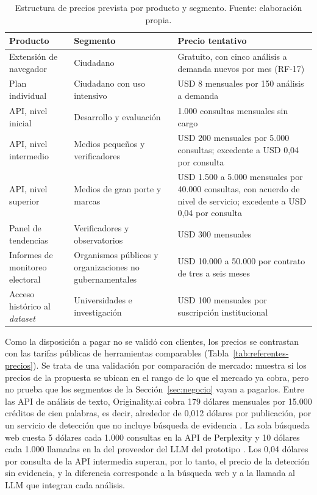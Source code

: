 \begin{table}[t]
  \centering
  \small
  \caption{Estructura de precios prevista por producto y segmento. Fuente: elaboración propia.}
  \label{tab:pricing}
  \begin{tabular}{p{4.4cm} p{4.2cm} p{4.6cm}}
    \hline
    \textbf{Producto} & \textbf{Segmento} & \textbf{Precio tentativo} \\
    \hline
    Extensión de navegador & Ciudadano & Gratuito, con cinco análisis a demanda nuevos por mes (RF-17) \\
    Plan individual & Ciudadano con uso intensivo & USD 8 mensuales por 150 análisis a demanda \\
    API, nivel inicial & Desarrollo y evaluación & 1.000 consultas mensuales sin cargo \\
    API, nivel intermedio & Medios pequeños y verificadores & USD 200 mensuales por 5.000 consultas; excedente a USD 0,04 por consulta \\
    API, nivel superior & Medios de gran porte y marcas & USD 1.500 a 5.000 mensuales por 40.000 consultas, con acuerdo de nivel de servicio; excedente a USD 0,04 por consulta \\
    Panel de tendencias & Verificadores y observatorios & USD 300 mensuales \\
    Informes de monitoreo electoral & Organismos públicos y organizaciones no gubernamentales & USD 10.000 a 50.000 por contrato de tres a seis meses \\
    Acceso histórico al \textit{dataset} & Universidades e investigación & USD 100 mensuales por suscripción institucional \\
    \hline
  \end{tabular}
\end{table}

Como la disposición a pagar no se validó con clientes, los precios se contrastan con las tarifas públicas de herramientas comparables (Tabla~\ref{tab:referentes-precios}). Se trata de una validación por comparación de mercado: muestra si los precios de la propuesta se ubican en el rango de lo que el mercado ya cobra, pero no prueba que los segmentos de la Sección~\ref{sec:negocio} vayan a pagarlos. Entre las API de análisis de texto, Originality.ai cobra 179 dólares mensuales por 15.000 créditos de cien palabras, es decir, alrededor de 0,012 dólares por publicación, por un servicio de detección que no incluye búsqueda de evidencia \parencite{OriginalityAI2026}. La sola búsqueda web cuesta 5 dólares cada 1.000 consultas en la API de Perplexity \parencite{Perplexity2026} y 10 dólares cada 1.000 llamadas en la del proveedor del LLM del prototipo \parencite{OpenAI2026}. Los 0,04 dólares por consulta de la API intermedia superan, por lo tanto, el precio de la detección sin evidencia, y la diferencia corresponde a la búsqueda web y a la llamada al LLM que integran cada análisis.

